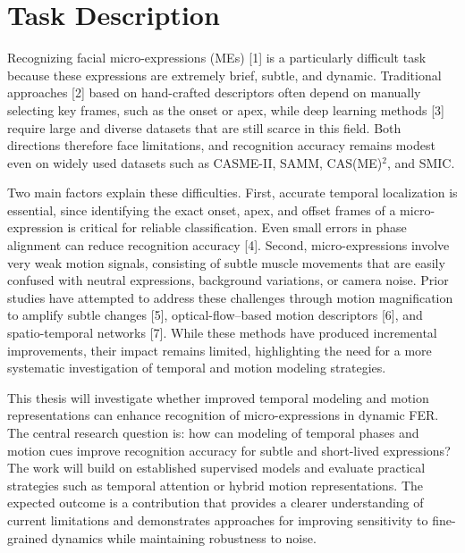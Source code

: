 
\thispagestyle{empty}
\chapter*{Task Description}


\bigskip

\noindent Recognizing facial micro-expressions (MEs) [1] is a particularly difficult task because these expressions are extremely brief, subtle, and dynamic. Traditional approaches [2] based on hand-crafted descriptors often depend on manually selecting key frames, such as the onset or apex, while deep learning methods [3] require large and diverse datasets that are still scarce in this field. Both directions therefore face limitations, and recognition accuracy remains modest even on widely used datasets such as CASME-II, SAMM, CAS(ME)$^2$, and SMIC.

Two main factors explain these difficulties. First, accurate temporal localization is essential, since identifying the exact onset, apex, and offset frames of a micro-expression is critical for reliable classification. Even small errors in phase alignment can reduce recognition accuracy [4]. Second, micro-expressions involve very weak motion signals, consisting of subtle muscle movements that are easily confused with neutral expressions, background variations, or camera noise. Prior studies have attempted to address these challenges through motion magnification to amplify subtle changes [5], optical-flow--based motion descriptors [6], and spatio-temporal networks [7]. While these methods have produced incremental improvements, their impact remains limited, highlighting the need for a more systematic investigation of temporal and motion modeling strategies.

This thesis will investigate whether improved temporal modeling and motion representations can enhance recognition of micro-expressions in dynamic FER. The central research question is: how can modeling of temporal phases and motion cues improve recognition accuracy for subtle and short-lived expressions? The work will build on established supervised models and evaluate practical strategies such as temporal attention or hybrid motion representations. The expected outcome is a contribution that provides a clearer understanding of current limitations and demonstrates approaches for improving sensitivity to fine-grained dynamics while maintaining robustness to noise.

